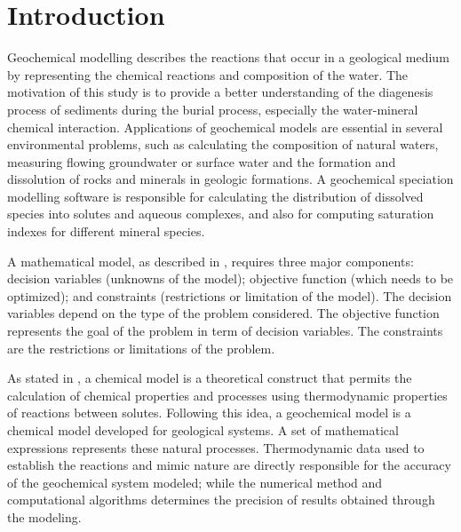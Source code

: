 \chapter{Introduction} 
\label{chapter:intro}


Geochemical modelling describes the reactions that occur in a geological medium by representing the chemical reactions and composition of the water. The motivation of this study is to provide a better understanding of the diagenesis process of sediments during the burial process, especially the water-mineral chemical interaction. Applications of geochemical models are essential in several environmental problems, such as calculating the composition of natural waters, measuring flowing groundwater or surface water and the formation and dissolution of rocks and minerals in geologic formations. A geochemical speciation modelling software is responsible for calculating the distribution of dissolved species into solutes and aqueous complexes, and also for computing saturation indexes for different mineral species. 


A mathematical model, as described in \cite{Sarker:08}, requires three major components: decision variables (unknowns of the model); objective function (which needs to be optimized); and constraints (restrictions or limitation of the model). 
The decision variables depend on the type of the problem considered.  The objective function represents the goal of the problem in term of decision variables. The constraints are the restrictions or limitations of the problem.

As stated in \cite{Drever:05}, a chemical model is a theoretical construct that permits the calculation of chemical properties and processes using thermodynamic properties of reactions between solutes. Following this idea, a geochemical model is a chemical model developed for geological systems. A set of mathematical expressions represents these natural processes. Thermodynamic data used to establish the reactions and mimic nature are directly responsible for the accuracy of the geochemical system modeled; while the numerical method and computational algorithms determines the precision of results obtained through the modeling.


